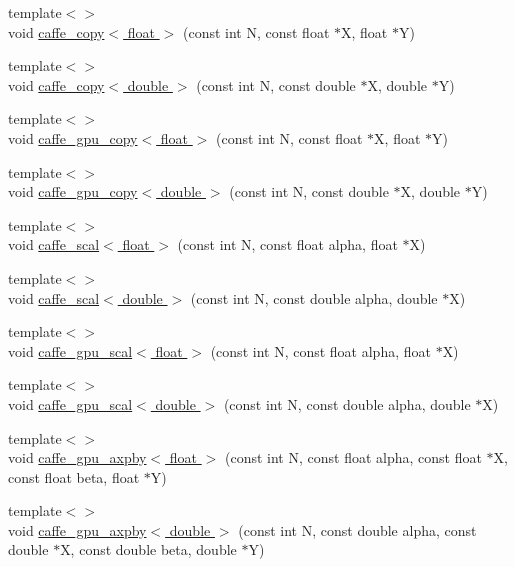 \begin{DoxyCompactItemize}
\item 
{\footnotesize template$<$$>$ }\\void \hyperlink{namespacecaffe_a3723a95299725cf5cc0a1a61692b39cb}{caffe\+\_\+copy$<$ float $>$} (const int N, const float $\ast$X, float $\ast$Y)
\item 
{\footnotesize template$<$$>$ }\\void \hyperlink{namespacecaffe_a61f371523b84522535227f178cf34b8d}{caffe\+\_\+copy$<$ double $>$} (const int N, const double $\ast$X, double $\ast$Y)
\item 
{\footnotesize template$<$$>$ }\\void \hyperlink{namespacecaffe_af04ff52ea28a7ec927ce4725b67b9be6}{caffe\+\_\+gpu\+\_\+copy$<$ float $>$} (const int N, const float $\ast$X, float $\ast$Y)
\item 
{\footnotesize template$<$$>$ }\\void \hyperlink{namespacecaffe_a1b9d7b5aa7c4d8d65b33186191d07047}{caffe\+\_\+gpu\+\_\+copy$<$ double $>$} (const int N, const double $\ast$X, double $\ast$Y)
\item 
{\footnotesize template$<$$>$ }\\void \hyperlink{namespacecaffe_a53ccb0c1449e14351b86a919948d1a87}{caffe\+\_\+scal$<$ float $>$} (const int N, const float alpha, float $\ast$X)
\item 
{\footnotesize template$<$$>$ }\\void \hyperlink{namespacecaffe_a11cf505d7d4980d3d8b2eb84f76bc969}{caffe\+\_\+scal$<$ double $>$} (const int N, const double alpha, double $\ast$X)
\item 
{\footnotesize template$<$$>$ }\\void \hyperlink{namespacecaffe_a365e6c3706a5050ba1acdcc07fc137bb}{caffe\+\_\+gpu\+\_\+scal$<$ float $>$} (const int N, const float alpha, float $\ast$X)
\item 
{\footnotesize template$<$$>$ }\\void \hyperlink{namespacecaffe_a3d7bcbed67c1bd12137f521720796219}{caffe\+\_\+gpu\+\_\+scal$<$ double $>$} (const int N, const double alpha, double $\ast$X)
\item 
{\footnotesize template$<$$>$ }\\void \hyperlink{namespacecaffe_a4fcbbb3443235ea3eb786642d5ed0426}{caffe\+\_\+gpu\+\_\+axpby$<$ float $>$} (const int N, const float alpha, const float $\ast$X, const float beta, float $\ast$Y)
\item 
{\footnotesize template$<$$>$ }\\void \hyperlink{namespacecaffe_a3477487f7ae0b89c217b97c2ab29df62}{caffe\+\_\+gpu\+\_\+axpby$<$ double $>$} (const int N, const double alpha, const double $\ast$X, const double beta, double $\ast$Y)

\end{DoxyCompactItemize}
